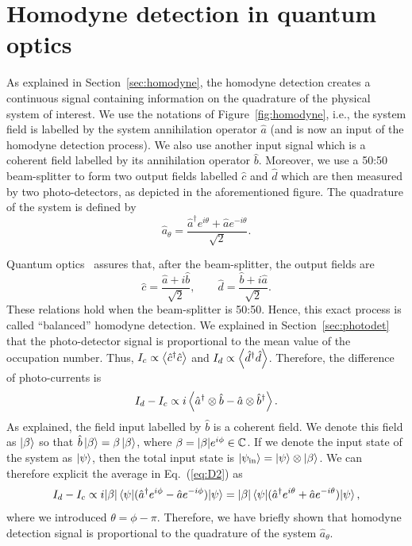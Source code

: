 \chapter{Homodyne detection in quantum optics}\label{app:homodyne}
As explained in Section~\ref{sec:homodyne}, the homodyne detection creates a continuous signal containing information on the quadrature of the physical system of interest. We use the notations of Figure~\ref{fig:homodyne}, i.e., the system field is labelled by the system annihilation operator $\hat{a}$ (and is now an input of the homodyne detection process). We also use another input signal which is a coherent field labelled by its annihilation operator $\hat{b}$. Moreover, we use a 50:50 beam-splitter to form two output fields labelled $\hat{c}$ and $\hat{d}$ which are then measured by two photo-detectors, as depicted in the aforementioned figure. The quadrature of the system is defined by
\begin{equation}
    \hat{a}_\theta=\frac{\hat{a}^\dagger e^{i\theta}+\hat{a}e^{-i\theta}}{\sqrt{2}}.
\end{equation}

Quantum optics~\cite{Gerry2023} assures that, after the beam-splitter, the output fields are 
\begin{equation}
    \hat{c}=\frac{\hat{a}+i\hat{b}}{\sqrt{2}},\qquad
    \hat{d}=\frac{\hat{b}+i\hat{a}}{\sqrt{2}}.
\end{equation}
These relations hold when the beam-splitter is 50:50. Hence, this exact process is called ``balanced'' homodyne detection. We explained in Section~\ref{sec:photodet} that the photo-detector signal is proportional to the mean value of the occupation number. Thus, $I_c \propto \expval{\hat{c}^\dagger \hat{c}}$ and $I_d \propto \expval{\hat{d}^\dagger \hat{d}}$. Therefore, the difference of photo-currents is
\begin{equation}\label{eq:D2}
    I_d-I_c \propto i\expval{\hat{a}^\dagger\otimes\hat{b}-\hat{a}\otimes\hat{b}^\dagger}.
\end{equation}
As explained, the field input labelled by $\hat{b}$ is a coherent field. We denote this field as $\ket{\beta}$ so that $\hat{b}\ket{\beta}=\beta\ket{\beta}$, where $\beta=\abs{\beta}e^{i\phi}\in\mathbb{C}$. If we denote the input state of the system as $\ket{\psi}$, then the total input state is $\ket{\psi_\text{in}}=\ket{\psi} \otimes \ket{\beta}$. We can therefore explicit the average in Eq.~(\ref{eq:D2}) as
\begin{equation}
    I_d-I_c \propto i\abs{\beta}\expval{(\hat{a}^\dagger e^{i\phi}-\hat{a}e^{-i\phi})}{\psi} = \abs{\beta}\expval{(\hat{a}^\dagger e^{i\theta}+\hat{a}e^{-i\theta})}{\psi},
\end{equation}
where we introduced $\theta=\phi-\pi$. Therefore, we have briefly shown that homodyne detection signal is proportional to the quadrature of the system $\hat{a}_\theta$.